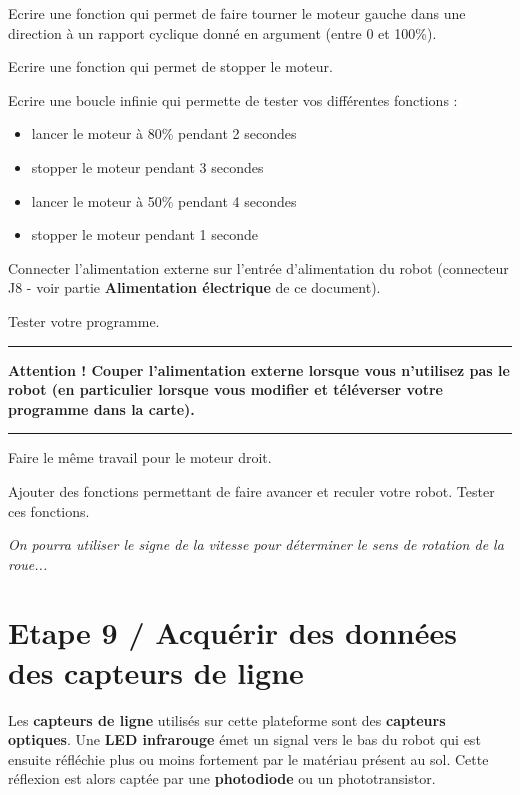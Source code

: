 \documentclass[a4paper,12pt,titlepage]{article} %
\begin{document}
\Manip Ecrire une fonction qui permet de faire tourner le moteur gauche dans une direction à un rapport cyclique donné en argument (entre 0 et 100\%).

\Manip Ecrire une fonction qui permet de stopper le moteur.

\Manip Ecrire une boucle infinie qui permette de tester vos différentes fonctions :

\begin{itemize}
	\item lancer le moteur à 80\% pendant 2 secondes
	\item stopper le moteur pendant 3 secondes
	\item lancer le moteur à 50\% pendant 4 secondes
	\item stopper le moteur pendant 1 seconde
\end{itemize}

\Manip Connecter l'alimentation externe sur l'entrée d'alimentation du robot (connecteur J8 - voir partie \textbf{Alimentation électrique} de ce document).

\Manip Tester votre programme.


\noindent \rule{\linewidth}{1pt}

\textbf{Attention ! Couper l'alimentation externe lorsque vous n'utilisez pas le robot (en particulier lorsque vous modifier et téléverser votre programme dans la carte).}

\noindent \rule{\linewidth}{1pt}

\medskip

\Manip Faire le même travail pour le moteur droit.

\Manip Ajouter des fonctions permettant de faire avancer et reculer votre robot. Tester ces fonctions.

\textit{On pourra utiliser le signe de la vitesse pour déterminer le sens de rotation de la roue...}


\newpage
\section{Etape 9 / Acquérir des données des capteurs de ligne}

Les \textbf{capteurs de ligne} utilisés sur cette plateforme sont des \textbf{capteurs optiques}. Une \textbf{LED infrarouge} émet un signal vers le bas du robot qui est ensuite réfléchie plus ou moins fortement par le matériau présent au sol. Cette réflexion est alors captée par une \textbf{photodiode} ou un phototransistor.
\end{document}
